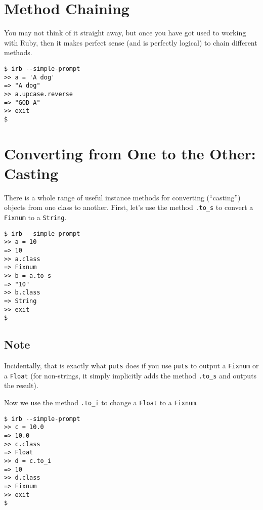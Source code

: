 \documentclass[a4paper]{book}
\begin{document}
\section{Method Chaining}\label{method-chaining}

You may not think of it straight away, but once you have got used to working with Ruby, then it makes perfect sense (and is perfectly logical) to chain different methods.

\begin{shaded}\begin{verbatim}
$ irb --simple-prompt
>> a = 'A dog'
=> "A dog"
>> a.upcase.reverse
=> "GOD A"
>> exit
$
\end{verbatim}\end{shaded}

\section{Converting from One to the Other: Casting}\label{converting-from-one-to-the-other-casting}

There is a whole range of useful instance methods for converting (“casting”) objects from one class to another. First, let's use the method \texttt{.to\_s} to convert a \texttt{Fixnum} to a \texttt{String}.

\begin{shaded}\begin{verbatim}
$ irb --simple-prompt
>> a = 10
=> 10
>> a.class
=> Fixnum
>> b = a.to_s
=> "10"
>> b.class
=> String
>> exit
$
\end{verbatim}\end{shaded}

\subsection{Note}\label{note-8}

Incidentally, that is exactly what \texttt{puts} does if you use \texttt{puts} to output a \texttt{Fixnum} or a \texttt{Float} (for non-strings, it simply implicitly adds the method \texttt{.to\_s} and outputs the result).

Now we use the method \texttt{.to\_i} to change a \texttt{Float} to a \texttt{Fixnum}.

\begin{shaded}\begin{verbatim}
$ irb --simple-prompt
>> c = 10.0
=> 10.0
>> c.class
=> Float
>> d = c.to_i
=> 10
>> d.class
=> Fixnum
>> exit
$
\end{verbatim}\end{shaded}
\end{document}
